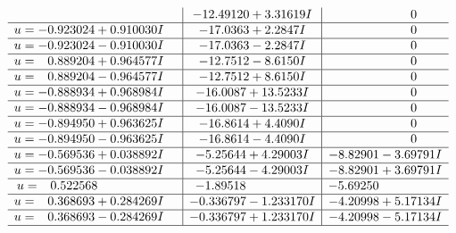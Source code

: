 \documentclass[1p]{elsarticle_modified}
\theoremstyle{definition}
\begin{document}
$$\begin{array}{c|c|c}
 & -12.49120 + 3.31619 I & \phantom{-0.000000 } 0 \\ \hline\begin{aligned}
u &= -0.923024 + 0.910030 I\end{aligned}
 & -17.0363 + 2.2847 I & \phantom{-0.000000 } 0 \\ \hline\begin{aligned}
u &= -0.923024 - 0.910030 I\end{aligned}
 & -17.0363 - 2.2847 I & \phantom{-0.000000 } 0 \\ \hline\begin{aligned}
u &= \phantom{-}0.889204 + 0.964577 I\end{aligned}
 & -12.7512 - 8.6150 I & \phantom{-0.000000 } 0 \\ \hline\begin{aligned}
u &= \phantom{-}0.889204 - 0.964577 I\end{aligned}
 & -12.7512 + 8.6150 I & \phantom{-0.000000 } 0 \\ \hline\begin{aligned}
u &= -0.888934 + 0.968984 I\end{aligned}
 & -16.0087 + 13.5233 I & \phantom{-0.000000 } 0 \\ \hline\begin{aligned}
u &= -0.888934 - 0.968984 I\end{aligned}
 & -16.0087 - 13.5233 I & \phantom{-0.000000 } 0 \\ \hline\begin{aligned}
u &= -0.894950 + 0.963625 I\end{aligned}
 & -16.8614 + 4.4090 I & \phantom{-0.000000 } 0 \\ \hline\begin{aligned}
u &= -0.894950 - 0.963625 I\end{aligned}
 & -16.8614 - 4.4090 I & \phantom{-0.000000 } 0 \\ \hline\begin{aligned}
u &= -0.569536 + 0.038892 I\end{aligned}
 & -5.25644 + 4.29003 I & -8.82901 - 3.69791 I \\ \hline\begin{aligned}
u &= -0.569536 - 0.038892 I\end{aligned}
 & -5.25644 - 4.29003 I & -8.82901 + 3.69791 I \\ \hline\begin{aligned}
u &= \phantom{-}0.522568\phantom{ +0.000000I}\end{aligned}
 & -1.89518\phantom{ +0.000000I} & -5.69250\phantom{ +0.000000I} \\ \hline\begin{aligned}
u &= \phantom{-}0.368693 + 0.284269 I\end{aligned}
 & -0.336797 - 1.233170 I & -4.20998 + 5.17134 I \\ \hline\begin{aligned}
u &= \phantom{-}0.368693 - 0.284269 I\end{aligned}
 & -0.336797 + 1.233170 I & -4.20998 - 5.17134 I\\
 \hline 
 \end{array}$$\newpage\newpage\renewcommand{\arraystretch}{1}
\end{document}
